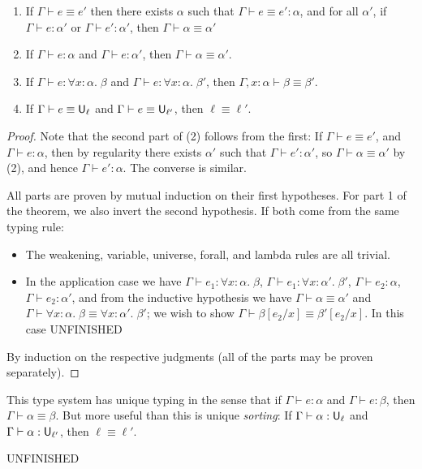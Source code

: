 \begin{lemma}
\begin{enumerate}
\item If $\Gamma\vdash e\equiv e'$ then there exists $\alpha$ such that $\Gamma\vdash e\equiv e':\alpha$, and for all $\alpha'$, if $\Gamma\vdash e:\alpha'$ or $\Gamma\vdash e':\alpha'$, then $\Gamma\vdash \alpha\equiv\alpha'$
\item If $\Gamma\vdash e:\alpha$ and $\Gamma\vdash e:\alpha'$, then $\Gamma\vdash \alpha\equiv\alpha'$.
\item If $\Gamma\vdash e:\forall x:\alpha.\;\beta$ and $\Gamma\vdash e:\forall x:\alpha.\;\beta'$, then $\Gamma,x:\alpha\vdash \beta\equiv\beta'$.
\item If $\Gamma\vdash e\equiv\U_\ell$ and $\Gamma\vdash e\equiv\U_{\ell'}$, then $\ell\equiv\ell'$.
\end{enumerate}
\end{lemma}
\begin{proof}
Note that the second part of (2) follows from the first: If $\Gamma\vdash e\equiv e'$, and $\Gamma\vdash e:\alpha$, then by regularity there exists $\alpha'$ such that $\Gamma\vdash e':\alpha'$, so $\Gamma\vdash\alpha\equiv\alpha'$ by (2), and hence $\Gamma\vdash e':\alpha$. The converse is similar.

All parts are proven by mutual induction on their first hypotheses. For part 1 of the theorem, we also invert the second hypothesis. If both come from the same typing rule:
\begin{itemize}
\item The weakening, variable, universe, forall, and lambda rules are all trivial.
\item In the application case we have $\Gamma\vdash e_1:\forall x:\alpha.\;\beta$, $\Gamma\vdash e_1:\forall x:\alpha'.\;\beta'$, $\Gamma\vdash e_2:\alpha$, $\Gamma\vdash e_2:\alpha'$, and from the inductive hypothesis we have $\Gamma\vdash\alpha\equiv\alpha'$ and $\Gamma\vdash\forall x:\alpha.\;\beta\equiv\forall x:\alpha'.\;\beta'$; we wish to show $\Gamma\vdash\beta[e_2/x]\equiv\beta'[e_2/x]$. In this case UNFINISHED
\end{itemize}
By induction on the respective judgments (all of the parts may be proven separately).
\end{proof}

This type system has unique typing in the sense that if $\Gamma\vdash e:\alpha$ and $\Gamma\vdash e:\beta$, then $\Gamma\vdash\alpha\equiv\beta$. But more useful than this is unique \emph{sorting}: If $\Gamma\vdash\alpha:\U_\ell$ and $\Gamma\vdash\alpha:\U_{\ell'}$, then $\ell\equiv\ell'$.

UNFINISHED

%
